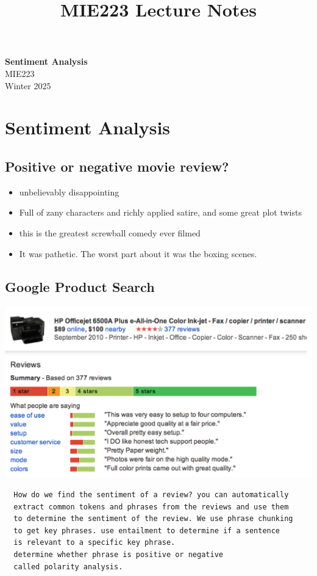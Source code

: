 \documentclass[11pt]{article}
\theoremstyle{definition}
\begin{document}
\setcounter{section}{0}
\title{MIE223 Lecture Notes}

\thispagestyle{empty}

\begin{center}
{\LARGE \bf Sentiment Analysis}\\
{\large MIE223}\\
Winter 2025
\end{center}
\section{Sentiment Analysis}
\subsection{Positive or negative movie review?}
\begin{itemize}
  \item unbelievably disappointing
  \item Full of zany characters and richly applied satire, and some
  great plot twists
  \item this is the greatest screwball comedy ever filmed
  \item It was pathetic. The worst part about it was the boxing
  scenes.
\end{itemize}

\subsection{Google Product Search}
\includegraphics[width=\textwidth]{5.png}
\begin{verbatim}
  How do we find the sentiment of a review? you can automatically 
  extract common tokens and phrases from the reviews and use them 
  to determine the sentiment of the review. We use phrase chunking 
  to get key phrases. use entailment to determine if a sentence 
  is relevant to a specific key phrase.
  determine whether phrase is positive or negative
  called polarity analysis.
\end{verbatim}
\end{document}
